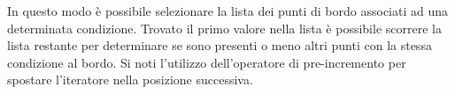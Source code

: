 \lstset{basicstyle=\scriptsize\sf}

\lstset{basicstyle=\sf}

In questo modo \`e possibile selezionare la lista dei punti di bordo associati ad una 
determinata condizione. Trovato il primo valore nella lista \`e possibile scorrere 
la lista restante per determinare se sono presenti o meno altri punti con la stessa
condizione al bordo. Si noti l'utilizzo dell'operatore di pre-incremento \cpp{++} per
spostare l'iteratore nella posizione successiva.

\lstset{basicstyle=\scriptsize\sf}

\lstset{basicstyle=\sf}
